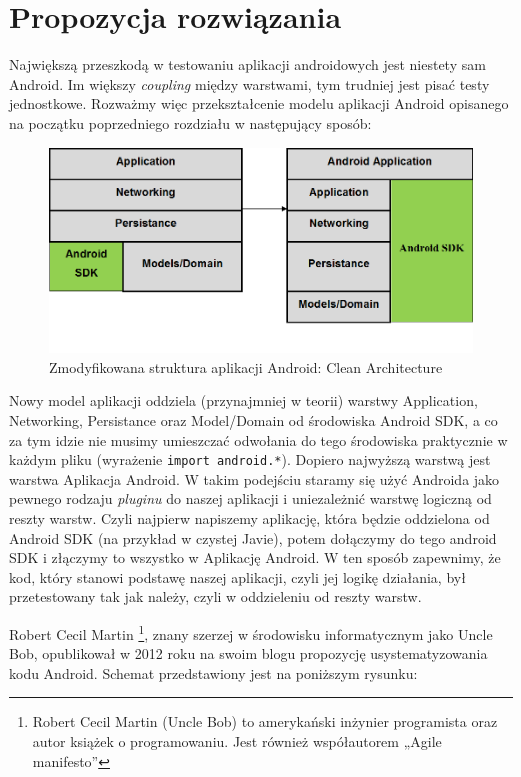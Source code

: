 \chapter{Propozycja rozwiązania}

Największą przeszkodą w testowaniu aplikacji androidowych jest niestety sam Android. Im większy \textit{coupling} między warstwami, tym trudniej jest pisać testy jednostkowe. Rozważmy więc przekształcenie modelu aplikacji Android opisanego na początku poprzedniego rozdziału w następujący sposób:

\begin{figure}[!htb]
    \centering
    \includegraphics[width=13cm]{imgs/ch4_opis_rozwiazania_1.png}
    \caption
{Zmodyfikowana struktura aplikacji Android: Clean Architecture}
    \label{fig:opis_rozwiazania}
\end{figure} 

Nowy model aplikacji oddziela (przynajmniej w teorii) warstwy Application, Networking, Persistance oraz Model/Domain od środowiska Android SDK, a co za tym idzie nie musimy umieszczać odwołania do tego środowiska praktycznie w każdym pliku (wyrażenie \texttt{import android.*}). Dopiero najwyższą warstwą jest warstwa Aplikacja Android. W takim podejściu staramy się użyć Androida jako pewnego rodzaju \textit{pluginu} do naszej aplikacji i uniezależnić warstwę logiczną od reszty warstw. Czyli najpierw napiszemy aplikację, która będzie oddzielona od Android SDK (na przykład w czystej Javie), potem dołączymy do tego android SDK i złączymy to wszystko w Aplikację Android. W ten sposób zapewnimy, że kod, który stanowi podstawę naszej aplikacji, czyli jej logikę działania, był przetestowany tak jak należy, czyli w oddzieleniu od reszty warstw.

Robert Cecil Martin \footnote{Robert Cecil Martin (Uncle Bob) to amerykański inżynier programista oraz autor książek o programowaniu. Jest również współautorem „Agile manifesto”}, znany szerzej w środowisku informatycznym jako Uncle Bob, opublikował w 2012 roku na swoim blogu propozycję usystematyzowania kodu Android. Schemat przedstawiony jest na poniższym rysunku:

